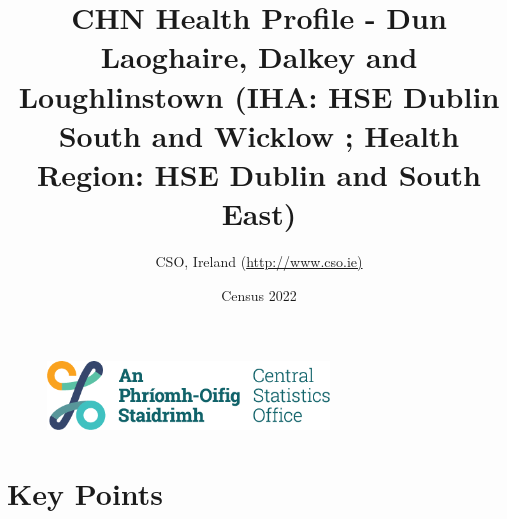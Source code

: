 \documentclass{article}
\title{CHN Health Profile - Dun Laoghaire, Dalkey and Loughlinstown (IHA: HSE Dublin South and Wicklow ;  Health Region: HSE Dublin and South East) }
\date{Census 2022}
\author{CSO, Ireland  (\url{http://www.cso.ie)}}
\begin{document}


\begin{figure}
	\centering
\includegraphics[width =75mm]{../figures/CSO_Logo.png}
\end{figure}

				 
		   
						  
														  
																																													
												 
			 
\maketitle
					
													   
				 
						 
																																																																											   
				 
				  
  \pagebreak
    	    \tableofcontents

\pagebreak


\section{Key Points}
\end{document}
